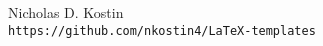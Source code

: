 \documentclass{article}
\numberwithin{equation}{section}
\begin{document}
Nicholas D. Kostin \\
\texttt{https://github.com/nkostin4/LaTeX-templates}
\end{document}
